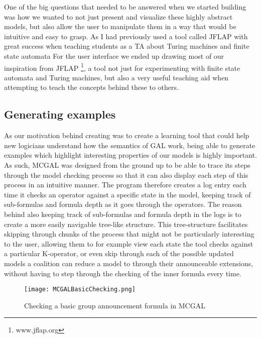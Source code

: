 One of the big questions that needed to be answered when we started building \cname was how we wanted to not just present and visualize these highly abstract models, but also allow the user to manipulate them in a way that would be intuitive and easy to grasp. As I had previously used a tool called JFLAP with great success when teaching students as a TA about Turing machines and finite state automata
For the user interface we ended up drawing most of our inspiration from JFLAP \footnote{www.jflap.org}, a tool not just for experimenting with finite state automata and Turing machines, but also a very useful teaching aid when attempting to teach the concepts behind these to others.


\subsection{Generating examples}
As our motivation behind creating \cname was to create a learning tool that could help new logicians understand how the semantics of GAL work, being able to generate examples which highlight interesting properties of our models is highly important. As such, MCGAL was designed from the ground up to be able to trace its steps through the model checking process so that it can also display each step of this process in an intuitive manner. The program therefore creates a log entry each time it checks an operator against a specific state in the model, keeping track of sub-formulas and formula depth as it goes through the operators. The reason behind also keeping track of sub-formulas and formula depth in the logs is to create a more easily navigable tree-like structure. This tree-structure facilitates skipping through chunks of the process that might not be particularly interesting to the user, allowing them to for example view each state the tool checks against a particular K-operator, or even skip through each of the possible updated models a coalition can reduce a model to through their announceable extensions, without having to step through the checking of the inner formula every time.

\begin{figure}[H]
	\label{fig:basicGalChecking}
	\caption{Checking a basic group announcement formula in MCGAL}
	\texttt{[image: MCGALBasicChecking.png]}
\end{figure}

